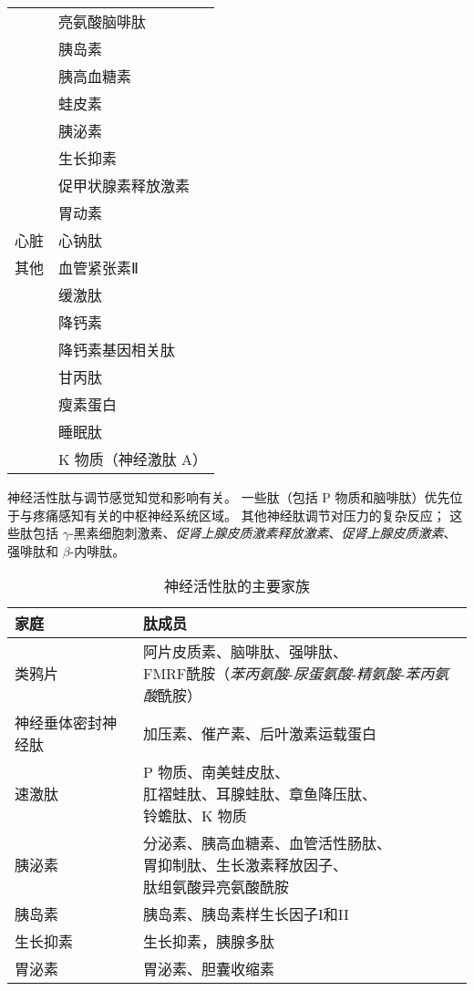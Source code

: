 \begin{table}[htbp]
\begin{tabular}{ll}
		 & 亮氨酸脑啡肽   \\
		 & 胰岛素   \\
		 & 胰高血糖素   \\
		 & 蛙皮素   \\
		 & 胰泌素   \\
		 & 生长抑素   \\
		 & 促甲状腺素释放激素   \\
		 & 胃动素   \\
		心脏 & 心钠肽   \\
		其他 & 血管紧张素Ⅱ   \\
		 & 缓激肽   \\
		 & 降钙素   \\
		 & 降钙素基因相关肽   \\
		 & 甘丙肽   \\
		 & 瘦素蛋白   \\
		 & 睡眠肽   \\
		 & K 物质（神经激肽 A）   \\
		\bottomrule
	\end{tabular}
\end{table}


神经活性肽与调节感觉知觉和影响有关。
一些肽（包括 P 物质和脑啡肽）优先位于与疼痛感知有关的中枢神经系统区域。
其他神经肽调节对压力的复杂反应；
这些肽包括 $\gamma$-黑素细胞刺激素、\textit{促肾上腺皮质激素释放激素}、\textit{促肾上腺皮质激素}、强啡肽和 $\beta$-内啡肽。


\begin{table}[htbp]
	\caption{神经活性肽的主要家族} \label{tab:16_3} \centering
	\begin{tabular}{ll}
		\toprule
		家庭 & 肽成员 \\
		\midrule
		类鸦片 & \makecell[l]{阿片皮质素、脑啡肽、强啡肽、\\FMRF酰胺（\textit{苯丙氨酸}-\textit{尿蛋氨酸}-\textit{精氨酸}-\textit{苯丙氨酸}酰胺）}  \\
		神经垂体密封神经肽 & 加压素、催产素、后叶激素运载蛋白  \\
		速激肽 & \makecell[l]{P 物质、南美蛙皮肽、\\肛褶蛙肽、耳腺蛙肽、章鱼降压肽、\\铃蟾肽、K 物质}  \\
		胰泌素 & \makecell[l]{分泌素、胰高血糖素、血管活性肠肽、\\胃抑制肽、生长激素释放因子、\\肽组氨酸异亮氨酸酰胺}  \\
		胰岛素 & 胰岛素、胰岛素样生长因子I和II  \\
		生长抑素 & 生长抑素，胰腺多肽  \\
		胃泌素 & 胃泌素、胆囊收缩素  \\
		\bottomrule
	\end{tabular}
\end{table}


